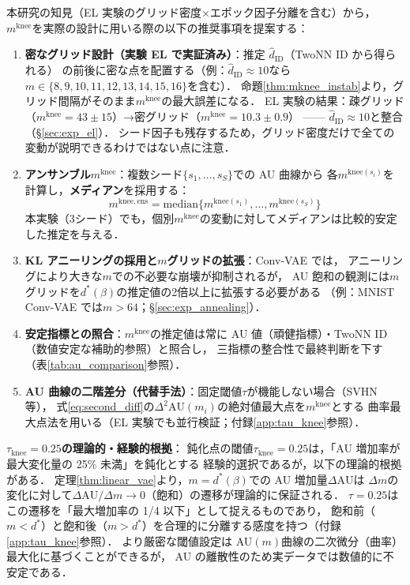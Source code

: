 \documentclass[11pt,a4paper]{jsarticle}
\newcommand{\mknee}{m^{\mathrm{knee}}}
\begin{document}
本研究の知見（EL 実験のグリッド密度×エポック因子分離を含む）から，
$\mknee$を実際の設計に用いる際の以下の推奨事項を提案する：
\begin{enumerate}
  \item \textbf{密なグリッド設計（実験 EL で実証済み）}：推定 $\hat{d}_\mathrm{ID}$（TwoNN ID から得られる）
        の前後に密な点を配置する（例：$\hat{d}_\mathrm{ID} \approx 10$なら$m \in \{8,9,10,11,12,13,14,15,16\}$を含む）．
        命題\ref{thm:mknee_instab}より，グリッド間隔がそのまま$\mknee$の最大誤差になる．
        EL 実験の結果：疎グリッド（$\mknee=43\pm15$）→密グリッド（$\mknee=10.3\pm0.9$）
        —— $\hat{d}_\mathrm{ID} \approx 10$と整合（§\ref{sec:exp_el}）．
        シード因子も残存するため，グリッド密度だけで全ての変動が説明できるわけではない点に注意．
  \item \textbf{アンサンブル$\mknee$}：複数シード$\{s_1,\ldots,s_S\}$での AU 曲線から
        各$m^{\mathrm{knee}(s_i)}$を計算し，\textbf{メディアン}を採用する：
        \begin{equation}
          m^{\mathrm{knee,ens}} = \mathrm{median}\bigl\{m^{\mathrm{knee}(s_1)}, \ldots, m^{\mathrm{knee}(s_S)}\bigr\}
          \label{eq:mknee_ens}
        \end{equation}
        本実験（3シード）でも，個別$\mknee$の変動に対してメディアンは比較的安定した推定を与える．
  \item \textbf{KL アニーリングの採用と$m$グリッドの拡張}：Conv-VAE では，
        アニーリングにより大きな$m$での不必要な崩壊が抑制されるが，
        AU 飽和の観測には$m$グリッドを$d^*(\beta)$の推定値の2倍以上に拡張する必要がある
        （例：MNIST Conv-VAE では$m > 64$；§\ref{sec:exp_annealing}）．
  \item \textbf{安定指標との照合}：$\mknee$の推定値は常に AU 値（頑健指標）・TwoNN ID（数値安定な補助的参照）と照合し，
        三指標の整合性で最終判断を下す（表\ref{tab:au_comparison}参照）．
  \item \textbf{AU 曲線の二階差分（代替手法）}：固定閾値$\tau$が機能しない場合（SVHN 等），
        式\eqref{eq:second_diff}の$\Delta^2\mathrm{AU}(m_i)$の絶対値最大点を$\mknee$とする
        曲率最大点法を用いる（EL 実験でも並行検証；付録\ref{app:tau_knee}参照）．
\end{enumerate}

\textbf{$\tau_{\mathrm{knee}} = 0.25$の理論的・経験的根拠}：
鈍化点の閾値$\tau_{\mathrm{knee}} = 0.25$は，「AU 増加率が最大変化量の 25\% 未満」を鈍化とする
経験的選択であるが，以下の理論的根拠がある．
定理\ref{thm:linear_vae}より，$m = d^*(\beta)$での AU 増加量$\Delta\mathrm{AU}$は
$\Delta m$の変化に対して$\Delta\mathrm{AU}/\Delta m \to 0$（飽和）の遷移が理論的に保証される．
$\tau = 0.25$はこの遷移を「最大増加率の 1/4 以下」として捉えるものであり，
飽和前（$m < d^*$）と飽和後（$m > d^*$）を合理的に分離する感度を持つ（付録\ref{app:tau_knee}参照）．
より厳密な閾値設定は AU$(m)$曲線の二次微分（曲率）最大化に基づくことができるが，
AU の離散性のため実データでは数値的に不安定である．
\end{document}
